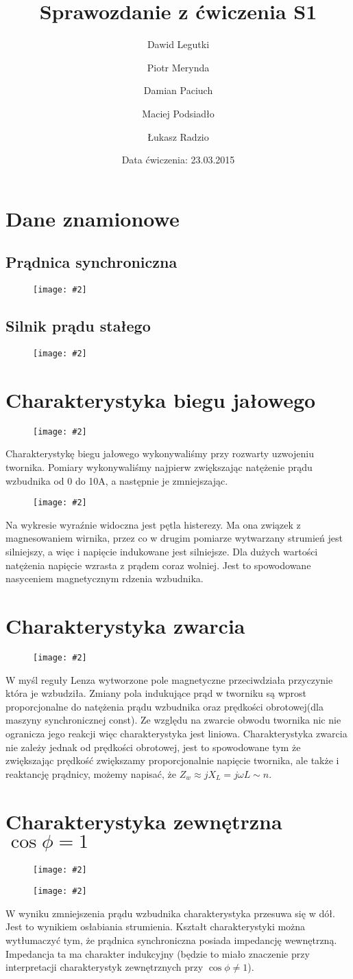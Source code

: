 \documentclass[12pt]{article}
\title{Sprawozdanie z ćwiczenia S1}
\author{ 
Dawid Legutki \and Piotr Merynda \and Damian Paciuch \and Maciej Podsiadło \and Łukasz Radzio}
\date{Data ćwiczenia: 23.03.2015}
\newcommand{\obrazek}[2]
{
	\begin{figure}[H]
	\centering
	\texttt{[image: \#2]}
	\end{figure}
}
\begin{document}
\maketitle
\section{Dane znamionowe}
\subsection{Prądnica synchroniczna}
	\obrazek{8}{tabele/pradnica}
	\subsection{Silnik prądu stałego}
	\obrazek{8}{tabele/silnik}
\section{Charakterystyka biegu jałowego}
	\obrazek{5}{tabele/jalowy}
Charakterystykę biegu jałowego wykonywaliśmy przy rozwarty uzwojeniu twornika. Pomiary wykonywaliśmy najpierw zwiększając natężenie prądu wzbudnika od 0 do 10A, a następnie je zmniejszając.
	\obrazek{12}{wykresy/jalowy}
Na wykresie wyraźnie widoczna jest pętla histerezy. Ma ona związek z magnesowaniem wirnika, przez co w drugim pomiarze wytwarzany strumień jest silniejszy, a więc i napięcie indukowane jest silniejsze. 
Dla dużych wartości natężenia napięcie wzrasta z prądem coraz wolniej. Jest to spowodowane nasyceniem magnetycznym rdzenia wzbudnika.

\section{Charakterystyka zwarcia}
	\obrazek{12}{wykresy/zwarcie}
	W myśl reguły Lenza wytworzone pole magnetyczne przeciwdziała przyczynie która je wzbudziła. Zmiany pola indukujące prąd w tworniku są wprost proporcjonalne do natężenia prądu wzbudnika oraz prędkości obrotowej(dla maszyny synchronicznej const). Ze względu na zwarcie obwodu twornika nic nie ogranicza jego reakcji więc charakterystyka jest liniowa. Charakterystyka zwarcia nie zależy jednak od prędkości obrotowej, jest to spowodowane tym że zwiększając prędkość zwiększamy proporcjonalnie napięcie twornika, ale także i reaktancję prądnicy, możemy napisać, że $Z_w \approx jX_L= j\omega L \sim n$. 
	
\section{Charakterystyka zewnętrzna $\cos\phi=1$}
	\obrazek{8}{tabele/cosfi1}
	\obrazek{12}{wykresy/cosfi1} 
W wyniku zmniejszenia prądu wzbudnika charakterystyka przesuwa się w dół. Jest to wynikiem osłabiania strumienia.
Kształt charakterystyki można wytłumaczyć tym, że prądnica synchroniczna posiada impedancję wewnętrzną. Impedancja ta ma charakter indukcyjny (będzie to miało znaczenie przy interpretacji charakterystyk zewnętrznych przy $\cos \phi \neq 1$).
\end{document}
